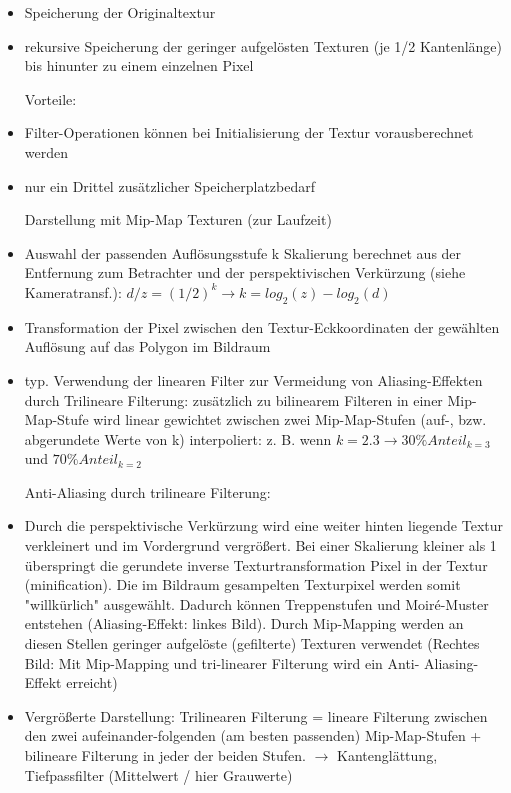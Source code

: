 \documentclass[10pt,landscape]{article}
\begin{document}
\begin{multicols}{3}
{\begin{itemize}
  Aufbau der Mip-Map (als Vorverarbeitungsschritt beim Rendering):
  \item Speicherung der Originaltextur
  \item rekursive Speicherung der geringer aufgelösten Texturen (je 1/2 Kantenlänge) bis hinunter zu einem einzelnen Pixel
  
  Vorteile:
  \item Filter-Operationen können bei Initialisierung der Textur vorausberechnet werden
  \item nur ein Drittel zusätzlicher Speicherplatzbedarf
  
  Darstellung mit Mip-Map Texturen (zur Laufzeit)
  \item Auswahl der passenden Auflösungsstufe k Skalierung berechnet aus der Entfernung zum Betrachter und der perspektivischen Verkürzung (siehe Kameratransf.): $d/z = (1/2)^k \rightarrow k = log_2(z)-log_2(d)$
  \item Transformation der Pixel zwischen den Textur-Eckkoordinaten der gewählten Auflösung auf das Polygon im Bildraum
  \item typ. Verwendung der linearen Filter zur Vermeidung von Aliasing-Effekten durch Trilineare Filterung: zusätzlich zu bilinearem Filteren in einer Mip-Map-Stufe wird linear gewichtet zwischen zwei Mip-Map-Stufen (auf-, bzw. abgerundete Werte von k) interpoliert: z. B. wenn $k = 2.3 \rightarrow 30\% Anteil_{k=3}$ und $70\% Anteil_{k=2}$
  
  
  Anti-Aliasing durch trilineare Filterung:
  \item Durch die perspektivische Verkürzung wird eine weiter hinten liegende Textur verkleinert und im Vordergrund vergrößert. Bei einer Skalierung kleiner als 1 überspringt die gerundete inverse Texturtransformation Pixel in der Textur (minification). Die im Bildraum gesampelten Texturpixel werden somit "willkürlich" ausgewählt. Dadurch können Treppenstufen und Moiré-Muster entstehen (Aliasing-Effekt: linkes Bild). Durch Mip-Mapping werden an diesen Stellen geringer aufgelöste (gefilterte) Texturen verwendet (Rechtes Bild: Mit Mip-Mapping und tri-linearer Filterung wird ein Anti- Aliasing-Effekt erreicht)
  \item Vergrößerte Darstellung: Trilinearen Filterung = lineare Filterung zwischen den zwei aufeinander-folgenden (am besten passenden) Mip-Map-Stufen + bilineare Filterung in jeder der beiden Stufen. $\rightarrow$ Kantenglättung, Tiefpassfilter (Mittelwert / hier Grauwerte)
  

\end{itemize}}
\end{multicols}
\end{document}
